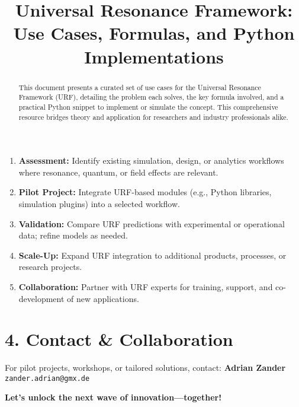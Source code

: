 \documentclass[12pt]{article}
\begin{document}
\begin{tcolorbox}[colback=blue!5!white, colframe=blue!75!black, title=Integration Steps]
\begin{enumerate}
    \item \textbf{Assessment:} Identify existing simulation, design, or analytics workflows where resonance, quantum, or field effects are relevant.
    \item \textbf{Pilot Project:} Integrate URF-based modules (e.g., Python libraries, simulation plugins) into a selected workflow.
    \item \textbf{Validation:} Compare URF predictions with experimental or operational data; refine models as needed.
    \item \textbf{Scale-Up:} Expand URF integration to additional products, processes, or research projects.
    \item \textbf{Collaboration:} Partner with URF experts for training, support, and co-development of new applications.
\end{enumerate}
\end{tcolorbox}

\section*{4. Contact \& Collaboration}

For pilot projects, workshops, or tailored solutions, contact:  
\textbf{Adrian Zander} \\
\texttt{zander.adrian@gmx.de}

\vspace{1em}
\noindent
\textbf{Let’s unlock the next wave of innovation—together!}

\title{\textbf{Universal Resonance Framework: Use Cases, Formulas, and Python Implementations}}

\maketitle

\clearpage
\begin{abstract}
This document presents a curated set of use cases for the Universal Resonance Framework (URF), detailing the problem each solves, the key formula involved, and a practical Python snippet to implement or simulate the concept. This comprehensive resource bridges theory and application for researchers and industry professionals alike.
\end{abstract}
\end{document}
